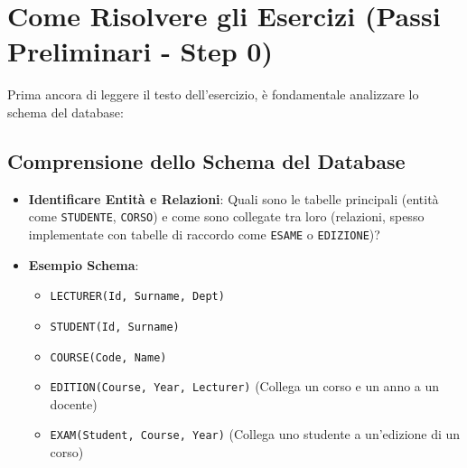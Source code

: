 \section{Come Risolvere gli Esercizi (Passi Preliminari - Step 0)}

Prima ancora di leggere il testo dell'esercizio, è fondamentale analizzare lo schema del database:

\subsection{Comprensione dello Schema del Database}
\begin{itemize}
    \item \textbf{Identificare Entità e Relazioni}: Quali sono le tabelle principali (entità come \texttt{STUDENTE}, \texttt{CORSO}) e come sono collegate tra loro (relazioni, spesso implementate con tabelle di raccordo come \texttt{ESAME} o \texttt{EDIZIONE})?
    \item \textbf{Esempio Schema}:
    \begin{itemize}
        \item \texttt{LECTURER(Id, Surname, Dept)}
        \item \texttt{STUDENT(Id, Surname)}
        \item \texttt{COURSE(Code, Name)}
        \item \texttt{EDITION(Course, Year, Lecturer)} (Collega un corso e un anno a un docente)
        \item \texttt{EXAM(Student, Course, Year)} (Collega uno studente a un'edizione di un corso)
    \end{itemize}
\end{itemize}

